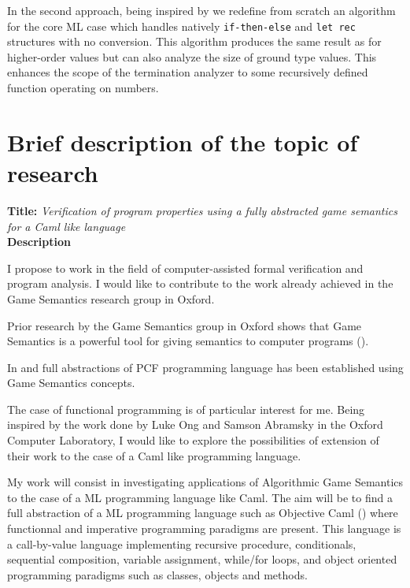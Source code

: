 \documentclass{article}
\begin{document}
\noindent In the second approach, being inspired by \cite{jones04}
we redefine from scratch an algorithm for the core ML case which
handles natively {\tt if-then-else} and {\tt let rec} structures
with no conversion. This algorithm produces the same result as
\cite{jones04} for higher-order values but can also analyze the size
of ground type values. This enhances the scope of the termination
analyzer to some recursively defined function operating on numbers.
\\


\pagebreak

\section*{Brief description of the topic of research}

\textbf{Title:}
\textsl{Verification of program properties using a fully abstracted game semantics for a Caml like language}
\\


\noindent \textbf{Description}

I propose to work in the field of computer-assisted formal verification and program analysis.
I would like to contribute to the work already achieved in the Game Semantics research group in Oxford.

Prior research by the Game Semantics group in Oxford shows that Game Semantics is a powerful tool for giving semantics to computer programs (\cite{abram01}).

In \cite{abr00} and \cite{ong00} full abstractions of PCF programming language has been established using  Game Semantics concepts.

The case of functional programming is of particular interest for me. Being inspired by the work done by Luke Ong and Samson Abramsky in the Oxford Computer Laboratory, I would like to explore the possibilities of extension of their work to the case of a Caml like programming language.

My work will consist in investigating applications of Algorithmic Game Semantics to the case of a ML programming language like Caml.
\textsl{}
The aim will be to find a full abstraction of a ML programming language such as Objective Caml (\cite{ocaml}) where functionnal and imperative programming paradigms are present.
This language is a call-by-value language implementing recursive procedure, conditionals, sequential composition, variable assignment, while/for loops, and object oriented programming paradigms such as classes, objects and methods.
\end{document}
